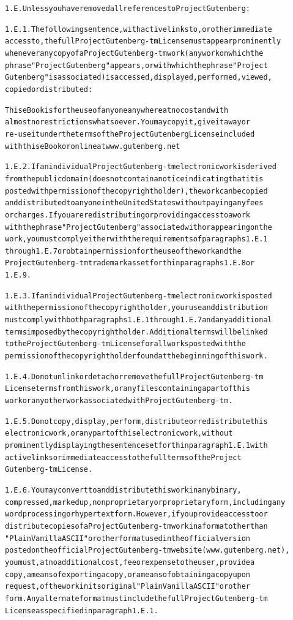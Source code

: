 \documentclass[12pt]{book}[2005/09/16]
\newenvironment{PGtext}{%
\begin{alltt}
\fontsize{8.1}{10}\ttfamily\selectfont}%
{\end{alltt}}
\renewcommand{\(}{{\upshape(}}
\renewcommand{\)}{{\upshape)}}
\begin{document}
\begin{PGtext}
1.E.  Unless you have removed all references to Project Gutenberg:

1.E.1.  The following sentence, with active links to, or other immediate
access to, the full Project Gutenberg-tm License must appear prominently
whenever any copy of a Project Gutenberg-tm work (any work on which the
phrase "Project Gutenberg" appears, or with which the phrase "Project
Gutenberg" is associated) is accessed, displayed, performed, viewed,
copied or distributed:

This eBook is for the use of anyone anywhere at no cost and with
almost no restrictions whatsoever.  You may copy it, give it away or
re-use it under the terms of the Project Gutenberg License included
with this eBook or online at www.gutenberg.net

1.E.2.  If an individual Project Gutenberg-tm electronic work is derived
from the public domain (does not contain a notice indicating that it is
posted with permission of the copyright holder), the work can be copied
and distributed to anyone in the United States without paying any fees
or charges.  If you are redistributing or providing access to a work
with the phrase "Project Gutenberg" associated with or appearing on the
work, you must comply either with the requirements of paragraphs 1.E.1
through 1.E.7 or obtain permission for the use of the work and the
Project Gutenberg-tm trademark as set forth in paragraphs 1.E.8 or
1.E.9.

1.E.3.  If an individual Project Gutenberg-tm electronic work is posted
with the permission of the copyright holder, your use and distribution
must comply with both paragraphs 1.E.1 through 1.E.7 and any additional
terms imposed by the copyright holder.  Additional terms will be linked
to the Project Gutenberg-tm License for all works posted with the
permission of the copyright holder found at the beginning of this work.

1.E.4.  Do not unlink or detach or remove the full Project Gutenberg-tm
License terms from this work, or any files containing a part of this
work or any other work associated with Project Gutenberg-tm.

1.E.5.  Do not copy, display, perform, distribute or redistribute this
electronic work, or any part of this electronic work, without
prominently displaying the sentence set forth in paragraph 1.E.1 with
active links or immediate access to the full terms of the Project
Gutenberg-tm License.

1.E.6.  You may convert to and distribute this work in any binary,
compressed, marked up, nonproprietary or proprietary form, including any
word processing or hypertext form.  However, if you provide access to or
distribute copies of a Project Gutenberg-tm work in a format other than
"Plain Vanilla ASCII" or other format used in the official version
posted on the official Project Gutenberg-tm web site (www.gutenberg.net),
you must, at no additional cost, fee or expense to the user, provide a
copy, a means of exporting a copy, or a means of obtaining a copy upon
request, of the work in its original "Plain Vanilla ASCII" or other
form.  Any alternate format must include the full Project Gutenberg-tm
License as specified in paragraph 1.E.1.


\end{PGtext}
\end{document}
